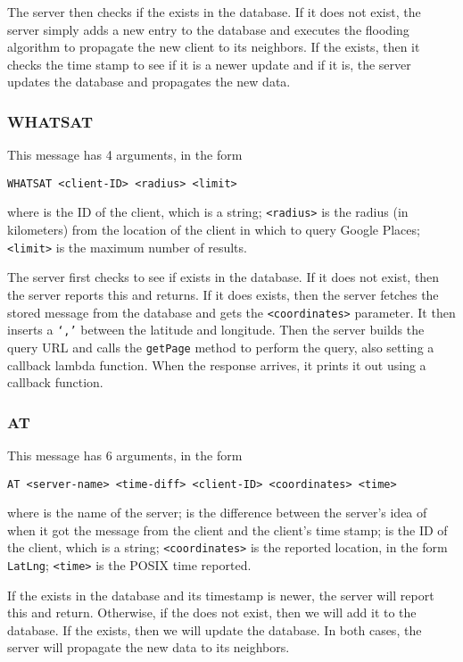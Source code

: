 \documentclass[letterpaper,twocolumn,10pt]{article}
\begin{document}
The server then checks if the {\tt <client-ID>} exists in the database. If it does not exist, the server simply adds a new entry to the database and executes the flooding algorithm to propagate the new client to its neighbors. If the {\tt <client-ID>} exists, then it checks the time stamp to see if it is a newer update and if it is, the server updates the database and propagates the new data.

\subsubsection{WHATSAT}

This message has 4 arguments, in the form
\begin{center}
{\tt \small WHATSAT <client-ID> <radius> <limit>}
\end{center}
where {\tt <client-ID>} is the ID of the client, which is a string; {\tt <radius>} is the radius (in kilometers) from the location of the client in which to query Google Places; {\tt <limit>} is the maximum number of results.

The server first checks to see if {\tt <client-ID>} exists in the database. If it does not exist, then the server reports this and returns. If it does exists, then the server fetches the stored message from the database and gets the {\tt <coordinates>} parameter. It then inserts a {\tt `,'} between the latitude and longitude. Then the server builds the query URL and calls the {\tt getPage} method to perform the query, also setting a callback lambda function. When the response arrives, it prints it out using a callback function.

\subsubsection{AT}

This message has 6 arguments, in the form
\begin{center}
{\tt \small AT <server-name> <time-diff> <client-ID> <coordinates> <time>}
\end{center}
where {\tt <server-name>} is the name of the server; {\tt <time-diff>} is the difference between the server's idea of when it got the message from the client and the client's time stamp; {\tt <client-ID>} is the ID of the client, which is a string; {\tt <coordinates>} is the reported location, in the form {\tt LatLng}; {\tt <time>} is the POSIX time reported.

If the {\tt <client-ID>} exists in the database and its timestamp is newer, the server will report this and return. Otherwise, if the {\tt <client-ID>} does not exist, then we will add it to the database. If the {\tt <client-ID>} exists, then we will update the database. In both cases, the server will propagate the new data to its neighbors.
\end{document}
